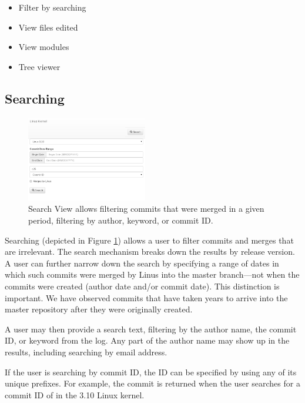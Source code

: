 \documentclass[conference, draftclsnofoot, draft]{IEEEtran}
\begin{document}
\begin{itemize}
        \item Filter by searching
        \item View files edited
        \item View modules
        \item Tree viewer
\end{itemize}

\subsection{Searching}

\begin{figure}
        \centering
        \includegraphics[width=0.47\textwidth]{figures/search.png}
        \caption{Search View allows filtering commits that were merged in a given
                period, filtering by author, keyword, or commit ID.}
        \label{fig:search}
\end{figure}

Searching (depicted in Figure \ref{fig:search}) allows a user to filter commits and
merges that are irrelevant. The search mechanism breaks down the results by release
version. A user can further narrow down the search by specifying a range of dates in
which such commits were merged by Linus into the master branch---not when the commits
were created (author date and/or commit date). This distinction is important. We have observed commits that have
taken years to arrive into the master repository after they were originally
created.

A user may then provide a search text, filtering by the author name, the commit ID,
or keyword from the log. Any part of the author name may show up in the results,
including searching by email address.

If the user is searching by commit ID, the ID can be specified by using any of its unique prefixes. For example, the commit
 is returned when the user searches for a
commit ID of  in the 3.10 Linux kernel. %
\end{document}
